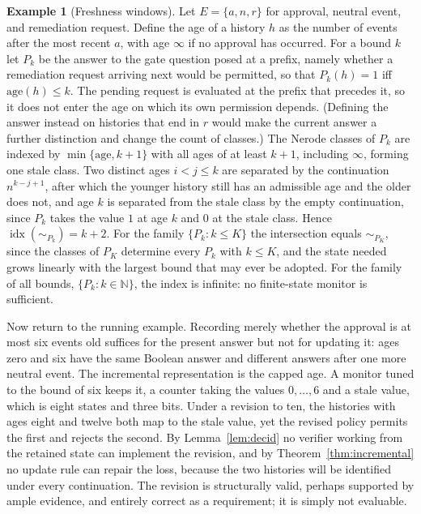 \documentclass[11pt]{article}
\theoremstyle{definition}
\newtheorem{example}{Example}
\theoremstyle{remark}
\newcommand{\Ev}{E}
\newcommand{\nerode}[1]{\sim_{#1}}
\newcommand{\idx}{\operatorname{idx}}
\begin{document}
\begin{example}[Freshness windows]\label{ex:fresh}
Let $\Ev=\{a,n,r\}$ for approval, neutral event, and remediation request. Define the age of a history $h$ as the number of events after the most recent $a$, with age $\infty$ if no approval has occurred. For a bound $k$ let $P_k$ be the answer to the gate question posed at a prefix, namely whether a remediation request arriving next would be permitted, so that $P_k(h)=1$ iff $\mathrm{age}(h)\le k$. The pending request is evaluated at the prefix that precedes it, so it does not enter the age on which its own permission depends. (Defining the answer instead on histories that end in $r$ would make the current answer a further distinction and change the count of classes.) The Nerode classes of $P_k$ are indexed by $\min\{\mathrm{age},k+1\}$ with all ages of at least $k+1$, including $\infty$, forming one stale class. Two distinct ages $i<j\le k$ are separated by the continuation $n^{k-j+1}$, after which the younger history still has an admissible age and the older does not, and age $k$ is separated from the stale class by the empty continuation, since $P_k$ takes the value $1$ at age $k$ and $0$ at the stale class. Hence $\idx(\nerode{P_k})=k+2$. For the family $\{P_k:k\le K\}$ the intersection equals $\nerode{P_K}$, since the classes of $P_K$ determine every $P_k$ with $k\le K$, and the state needed grows linearly with the largest bound that may ever be adopted. For the family of all bounds, $\{P_k:k\in\mathbb{N}\}$, the index is infinite: no finite-state monitor is sufficient.

Now return to the running example. Recording merely whether the approval is at most six events old suffices for the present answer but not for updating it: ages zero and six have the same Boolean answer and different answers after one more neutral event. The incremental representation is the capped age. A monitor tuned to the bound of six keeps it, a counter taking the values $0,\dots,6$ and a stale value, which is eight states and three bits. Under a revision to ten, the histories with ages eight and twelve both map to the stale value, yet the revised policy permits the first and rejects the second. By Lemma~\ref{lem:decid} no verifier working from the retained state can implement the revision, and by Theorem~\ref{thm:incremental} no update rule can repair the loss, because the two histories will be identified under every continuation. The revision is structurally valid, perhaps supported by ample evidence, and entirely correct as a requirement; it is simply not evaluable.

\end{example}
\end{document}
